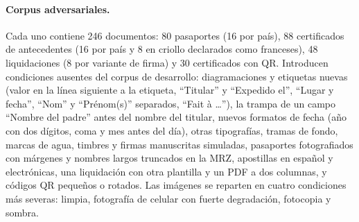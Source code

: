 \documentclass[11pt,a4paper]{article}
\begin{document}
\paragraph{Corpus adversariales.} Cada uno contiene 246 documentos: 80 pasaportes (16 por país), 88 certificados de antecedentes (16 por país y 8 en criollo declarados como franceses), 48 liquidaciones (8 por variante de firma) y 30 certificados con QR. Introducen condiciones ausentes del corpus de desarrollo: diagramaciones y etiquetas nuevas (valor en la línea siguiente a la etiqueta, ``Titular'' y ``Expedido el'', ``Lugar y fecha'', ``Nom'' y ``Prénom(s)'' separados, ``Fait à \ldots''), la trampa de un campo ``Nombre del padre'' antes del nombre del titular, nuevos formatos de fecha (año con dos dígitos, coma y mes antes del día), otras tipografías, tramas de fondo, marcas de agua, timbres y firmas manuscritas simuladas, pasaportes fotografiados con márgenes y nombres largos truncados en la MRZ, apostillas en español y electrónicas, una liquidación con otra plantilla y un PDF a dos columnas, y códigos QR pequeños o rotados. Las imágenes se reparten en cuatro condiciones más severas: limpia, fotografía de celular con fuerte degradación, fotocopia y sombra.
\end{document}

